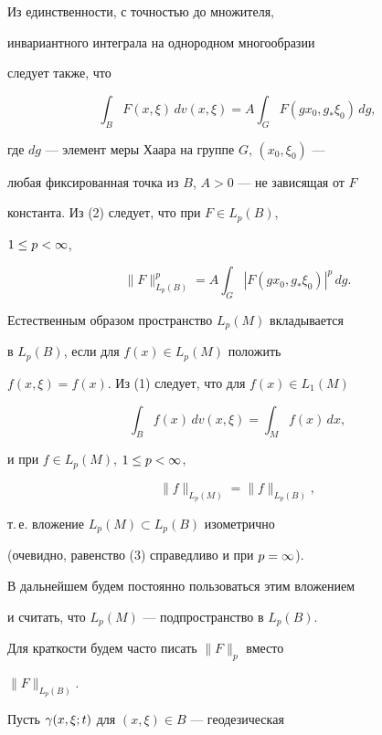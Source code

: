 Из единственности, с точностью до множителя,


инвариантного интеграла на однородном многообразии


следует также, что


\begin{equation}


\int_B F(x,\xi)\,dv(x,\xi)=


A\int_G F(gx_0,g_*\xi_0)\,dg,


\end{equation}


где $dg$ --- элемент меры Хаара на группе $G$, $(x_0,\xi_0)$ ---


любая фиксированная точка из $B$, $A>0$ --- не зависящая от $F$


константа. Из (2) следует, что при $F\in L_p(B)$,


$1\le p<\infty$,


$$


\|F\|^p_{L_p(B)}=A\int_G|F(gx_0,g_*\xi_0)|^p\,dg.


$$


Естественным образом пространство $L_p(M)$ вкладывается


в $L_p(B)$, если для $f(x)\in L_p(M)$ положить


$f(x,\xi)=f(x)$. Из (1) следует, что для $f(x)\in L_1(M)$


$$


\int_B f(x)\,dv(x,\xi)=\int_M f(x)\,dx,


$$


и при $f\in L_p(M)$, $1\le p<\infty$,


\begin{equation}


\|f\|_{L_p(M)}=\|f\|_{L_p(B)},


\end{equation}


т.\,е. вложение $L_p(M)\subset L_p(B)$ изометрично


(очевидно, равенство (3) справедливо и при $p=\infty$).


В дальнейшем будем постоянно пользоваться этим вложением


и считать, что $L_p(M)$ --- подпространство в $L_p(B)$.


Для краткости будем часто писать $\|F\|_p$ вместо


$\|F\|_{L_p(B)}$.





Пусть $\gamma(x,\xi;t)$ для $(x,\xi)\in B$ --- геодезическая


